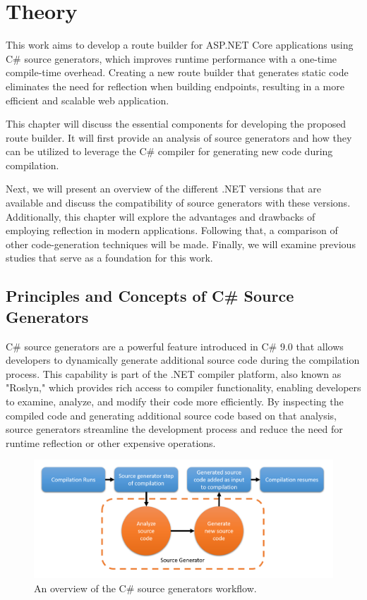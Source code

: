 \chapter{Theory}

This work aims to develop a route builder for ASP.NET Core applications using C\# source generators, which improves runtime performance with a one-time compile-time overhead. Creating a new route builder that generates static code eliminates the need for reflection when building endpoints, resulting in a more efficient and scalable web application.

This chapter will discuss the essential components for developing the proposed route builder. It will first provide an analysis of source generators and how they can be utilized to leverage the C\# compiler for generating new code during compilation.

Next, we will present an overview of the different .NET versions that are available and discuss the compatibility of source generators with these versions. Additionally, this chapter will explore the advantages and drawbacks of employing reflection in modern applications. Following that, a comparison of other code-generation techniques will be made. Finally, we will examine previous studies that serve as a foundation for this work.

\section{Principles and Concepts of C\# Source Generators}

C\# source generators are a powerful feature introduced in C\# 9.0 that allows developers to dynamically generate additional source code during the compilation process. This capability is part of the .NET compiler platform, also known as "Roslyn," which provides rich access to compiler functionality, enabling developers to examine, analyze, and modify their code more efficiently. By inspecting the compiled code and generating additional source code based on that analysis, source generators streamline the development process and reduce the need for runtime reflection or other expensive operations.


\begin{figure}[H]
\centering
\includegraphics[width=\linewidth]{graphics/source-generator-visualization.png}
\caption{An overview of the C\# source generators workflow.}
\label{fig:source_generators_overview}
\end{figure}

